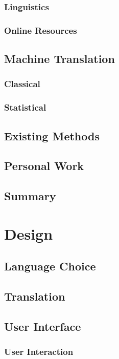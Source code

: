 \documentclass[12pt]{ociamthesis}  %
\begin{document}
\subsection{Linguistics}
\subsection{Online Resources}

\section{Machine Translation}
\label{machine translation}
\subsection{Classical}
\subsection{Statistical}

\section{Existing Methods}
\section{Personal Work}
\section{Summary}


\chapter{Design}

\section{Language Choice}
\section{Translation}
\section{User Interface}
	\subsection{User Interaction}
\end{document}
